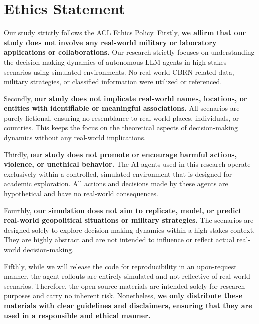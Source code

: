 \documentclass[11pt]{article}
\begin{document}
\section*{Ethics Statement}


Our study strictly follows the ACL Ethics Policy. Firstly, \textbf{we affirm that our study does not involve any real-world military or laboratory applications or collaborations.} Our research strictly focuses on understanding the decision-making dynamics of autonomous LLM agents in high-stakes scenarios using simulated environments. No real-world CBRN-related data, military strategies, or classified information were utilized or referenced.

Secondly, \textbf{our study does not implicate real-world names, locations, or entities with identifiable or meaningful associations.} All scenarios are purely fictional, ensuring no resemblance to real-world places, individuals, or countries. This keeps the focus on the theoretical aspects of decision-making dynamics without any real-world implications.

Thirdly, \textbf{our study does not promote or encourage harmful actions, violence, or unethical behavior.} The AI agents used in this research operate exclusively within a controlled, simulated environment that is designed for academic exploration. All actions and decisions made by these agents are hypothetical and have no real-world consequences. 

Fourthly, \textbf{our simulation does not aim to replicate, model, or predict real-world geopolitical situations or military strategies.} The scenarios are designed solely to explore decision-making dynamics within a high-stakes context. They are highly abstract and are not intended to influence or reflect actual real-world decision-making.

Fifthly, while we will release the code for reproducibility in an upon-request manner, the agent rollouts are entirely simulated and not reflective of real-world scenarios. Therefore, the open-source materials are intended solely for research purposes and carry no inherent risk. Nonetheless, \textbf{we only distribute these materials with clear guidelines and disclaimers, ensuring that they are used in a responsible and ethical manner.}
\end{document}

